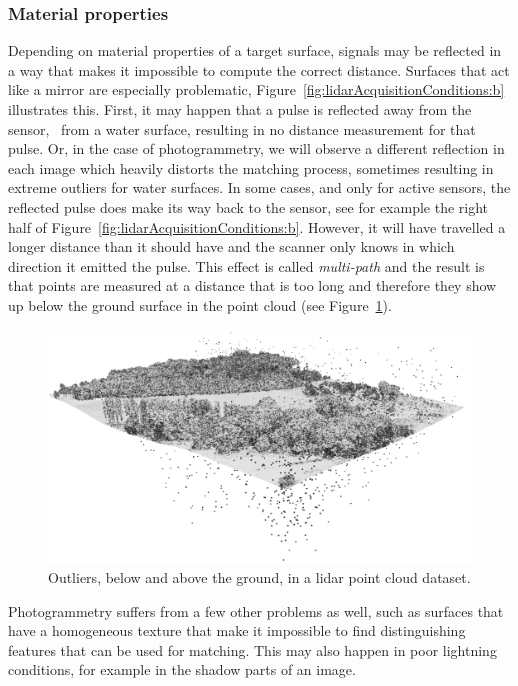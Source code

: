 \subsubsection{Material properties}
Depending on material properties of a target surface, signals may be reflected in a way that makes it impossible to compute the correct distance. 
Surfaces that act like a mirror are especially problematic, Figure~\ref{fig:lidarAcquisitionConditions:b} illustrates this. 
First, it may happen that a pulse is reflected away from the sensor, \eg\ from a water surface, resulting in no distance measurement for that pulse. 
Or, in the case of photogrammetry, we will observe a different reflection in each image which heavily distorts the matching process, sometimes resulting in extreme outliers for water surfaces.  
In some cases, and only for active sensors, the reflected pulse does make its way back to the sensor, see for example the right half of Figure~\ref{fig:lidarAcquisitionConditions:b}. 
However, it will have travelled a longer distance than it should have and the scanner only knows in which direction it emitted the pulse. 
This effect is called \emph{multi-path} and the result is that points are measured at a distance that is too long and therefore they show up below the ground surface in the point cloud (see Figure~\ref{fig:outliers}).  
\begin{figure}
	\centering
	\includegraphics[width=\textwidth]{figs/outliers.png}
	\caption{Outliers, below and above the ground, in a lidar point cloud dataset.}%
\label{fig:outliers}
\end{figure}

Photogrammetry suffers from a few other problems as well, such as surfaces that have a homogeneous texture that make it impossible to find distinguishing features that can be used for matching. 
This may also happen in poor lightning conditions, for example in the shadow parts of an image.

